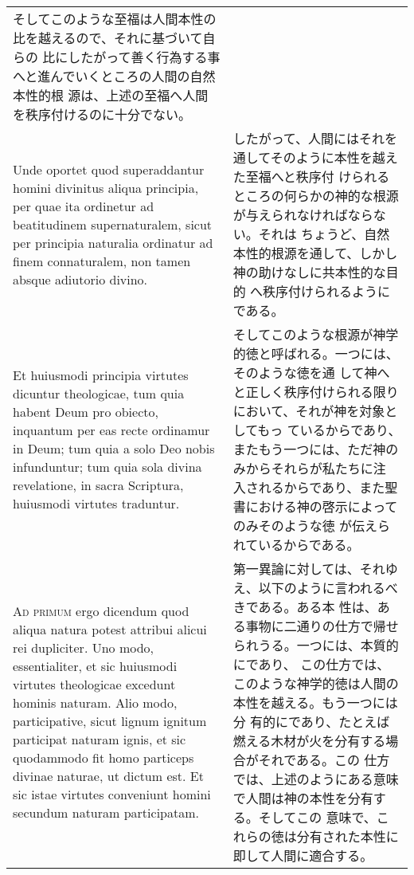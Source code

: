 \documentclass[10pt]{jsarticle}
\begin{document}
\begin{longtable}{p{21em}p{21em}}
 そしてこのような至福は人間本性の比を越えるので、それに基づいて自らの
 比にしたがって善く行為する事へと進んでいくところの人間の自然本性的根
 源は、上述の至福へ人間を秩序付けるのに十分でない。
 
\\


 Unde oportet quod superaddantur homini divinitus aliqua principia,
per quae ita ordinetur ad beatitudinem supernaturalem, sicut per
principia naturalia ordinatur ad finem connaturalem, non tamen absque
adiutorio divino.

 &

 したがって、人間にはそれを通してそのように本性を越えた至福へと秩序付
 けられるところの何らかの神的な根源が与えられなければならない。それは
 ちょうど、自然本性的根源を通して、しかし神の助けなしに共本性的な目的
 へ秩序付けられるようにである。

\\

 Et huiusmodi principia virtutes dicuntur theologicae, tum quia habent
Deum pro obiecto, inquantum per eas recte ordinamur in Deum; tum quia
a solo Deo nobis infunduntur; tum quia sola divina revelatione, in
sacra Scriptura, huiusmodi virtutes traduntur.

 &

 そしてこのような根源が神学的徳と呼ばれる。一つには、そのような徳を通
 して神へと正しく秩序付けられる限りにおいて、それが神を対象としてもっ
 ているからであり、またもう一つには、ただ神のみからそれらが私たちに注
 入されるからであり、また聖書における神の啓示によってのみそのような徳
 が伝えられているからである。
 
\\



{\scshape Ad primum} ergo dicendum quod aliqua natura potest attribui
alicui rei dupliciter. Uno modo, essentialiter, et sic huiusmodi
virtutes theologicae excedunt hominis naturam. Alio modo,
participative, sicut lignum ignitum participat naturam ignis, et sic
quodammodo fit homo particeps divinae naturae, ut dictum est. Et sic
istae virtutes conveniunt homini secundum naturam participatam.

&

 第一異論に対しては、それゆえ、以下のように言われるべきである。ある本
 性は、ある事物に二通りの仕方で帰せられうる。一つには、本質的にであり、
 この仕方では、このような神学的徳は人間の本性を越える。もう一つには分
 有的にであり、たとえば燃える木材が火を分有する場合がそれである。この
 仕方では、上述のようにある意味で人間は神の本性を分有する。そしてこの
 意味で、これらの徳は分有された本性に即して人間に適合する。
 

\end{longtable}
\end{document}
